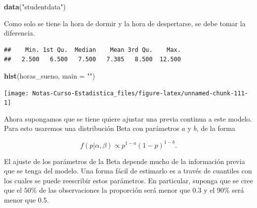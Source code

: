 \documentclass[
  12pt,
]{book}
\newenvironment{Shaded}{\begin{snugshade}}{\end{snugshade}}
\newcommand{\DataTypeTok}[1]{\textcolor[rgb]{0.13,0.29,0.53}{#1}}
\newcommand{\KeywordTok}[1]{\textcolor[rgb]{0.13,0.29,0.53}{\textbf{#1}}}
\newcommand{\NormalTok}[1]{#1}
\newcommand{\OperatorTok}[1]{\textcolor[rgb]{0.81,0.36,0.00}{\textbf{#1}}}
\newcommand{\StringTok}[1]{\textcolor[rgb]{0.31,0.60,0.02}{#1}}
\theoremstyle{definition}
\theoremstyle{definition}
\theoremstyle{definition}
\theoremstyle{remark}
\begin{document}
\begin{Shaded}
\begin{Highlighting}[]
\KeywordTok{data}\NormalTok{(}\StringTok{"studentdata"}\NormalTok{)}
\end{Highlighting}
\end{Shaded}

Como solo se tiene la hora de dormir y la hora de despertarse, se debe tomar la diferencia.

\begin{Shaded}
\end{Shaded}

\begin{verbatim}
##    Min. 1st Qu.  Median    Mean 3rd Qu.    Max. 
##   2.500   6.500   7.500   7.385   8.500  12.500
\end{verbatim}

\begin{Shaded}
\begin{Highlighting}[]
\KeywordTok{hist}\NormalTok{(horas_sueno, }\DataTypeTok{main =} \StringTok{""}\NormalTok{)}
\end{Highlighting}
\end{Shaded}

\begin{center}\texttt{[image: Notas-Curso-Estadistica\_files/figure-latex/unnamed-chunk-111-1]} \end{center}

Ahora supongamos que se tiene quiere ajustar una previa continua a este modelo. Para esto usaremos una distribución Beta con parámetros \(a\) y \(b\), de la forma

\[
    f(p\vert \alpha, \beta) \propto p^{1-a} (1-p)^{1-b}.
\]

El ajuste de los parámetros de la Beta depende mucho de la información
previa que se tenga del modelo. Una forma fácil de estimarlo es a
través de cuantiles con los cuales se puede reescribir estos
parámetros. En particular, suponga que se cree que el \(50\%\) de las
observaciones la proporción será menor que 0.3 y el \(90\%\) será menor
que 0.5.
\end{document}
